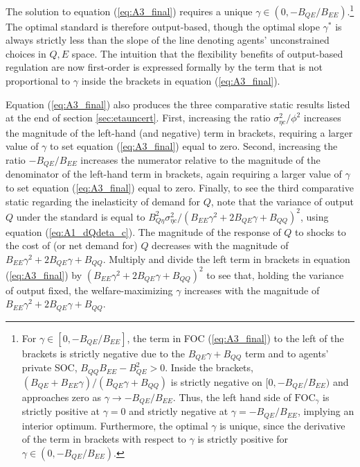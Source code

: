 \documentclass[12pt]{article}
\begin{document}
The solution to equation (\ref{eq:A3_final}) requires a unique $\gamma\in(0,-B_{QE}/B_{EE})$.\footnote{For $\gamma\in[0,-B_{QE}/B_{EE}]$, the term in FOC (\ref{eq:A3_final}) to the left of the brackets is strictly negative due to the $B_{QE}\gamma+B_{QQ}$ term and to agents' private SOC, $B_{QQ}B_{EE}-B_{QE}^2>0$. Inside the brackets, $(B_{QE}+B_{EE}\gamma)/(B_{QE}\gamma+B_{QQ})$ is strictly negative on $[0,-B_{QE}/B_{EE})$ and approaches zero as $\gamma\to-B_{QE}/B_{EE}$. Thus, the left hand side of $\text{FOC}_{\gamma}$ is strictly positive at $\gamma=0$ and strictly negative at $\gamma=-B_{QE}/B_{EE}$, implying an interior optimum. Furthermore, the optimal $\gamma$ is unique, since the derivative of the term in brackets with respect to $\gamma$ is strictly positive for $\gamma\in(0,-B_{QE}/B_{EE})$.\label{fn:unqiuegamma}} The optimal standard is therefore output-based, though the optimal slope $\gamma^*$ is always strictly less than the slope of the line denoting agents' unconstrained choices in $Q,E$ space. The intuition that the flexibility benefits of output-based regulation are now first-order is expressed formally by the term that is not proportional to $\gamma$ inside the brackets in equation (\ref{eq:A3_final}).

Equation (\ref{eq:A3_final}) also produces the three comparative static results listed at the end of section \ref{sec:etauncert}. First, increasing the ratio $\sigma^2_{\eta c}/\phi^2$ increases the magnitude of the left-hand (and negative) term in brackets, requiring a larger value of $\gamma$ to set equation (\ref{eq:A3_final}) equal to zero. Second, increasing the ratio $-B_{QE}/B_{EE}$ increases the numerator relative to the magnitude of the denominator of the left-hand term in brackets, again requiring a larger value of $\gamma$ to set equation (\ref{eq:A3_final}) equal to zero. Finally, to see the third comparative static regarding the inelasticity of demand for $Q$, note that the variance of output $Q$ under the standard is equal to $B_{Q\eta}^2\sigma_{\eta c}^2/(B_{EE}\gamma^2+2B_{QE}\gamma+B_{QQ})^2$, using equation (\ref{eq:A1_dQdeta_c}). The magnitude of the response of $Q$ to shocks to the cost of (or net demand for) $Q$ decreases with the magnitude of $B_{EE}\gamma^2+2B_{QE}\gamma+B_{QQ}$. Multiply and divide the left term in brackets in equation (\ref{eq:A3_final}) by $(B_{EE}\gamma^2+2B_{QE}\gamma+B_{QQ})^2$ to see that, holding the variance of output fixed, the welfare-maximizing $\gamma$ increases with the magnitude of $B_{EE}\gamma^2+2B_{QE}\gamma+B_{QQ}$.
\end{document}
